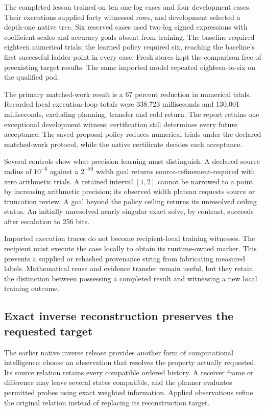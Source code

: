 The completed lesson trained on ten one-log cases and four development cases. Their executions supplied forty witnessed rows, and development selected a depth-one native tree. Six reserved cases used two-log signed expressions with coefficient scales and accuracy goals absent from training. The baseline required eighteen numerical trials; the learned policy required six, reaching the baseline's first successful ladder point in every case. Fresh stores kept the comparison free of preexisting target results. The same imported model repeated eighteen-to-six on the qualified pod.

The primary matched-work result is a 67 percent reduction in numerical trials. Recorded local execution-loop totals were 338.723 milliseconds and 130.001 milliseconds, excluding planning, transfer and cold return. The report retains one exceptional development witness; certification still determines every future acceptance. The saved proposal policy reduces numerical trials under the declared matched-work protocol, while the native certificate decides each acceptance.

Several controls show what precision learning must distinguish. A declared source radius of $10^{-6}$ against a $2^{-80}$ width goal returns source-refinement-required with zero arithmetic trials. A retained interval $[1,2]$ cannot be narrowed to a point by increasing arithmetic precision; its observed width plateau requests source or truncation review. A goal beyond the policy ceiling returns its unresolved ceiling status. An initially unresolved nearly singular exact solve, by contrast, succeeds after escalation to 256 bits.

Imported execution traces do not become recipient-local training witnesses. The recipient must execute the case locally to obtain its runtime-owned marker. This prevents a supplied or rehashed provenance string from fabricating measured labels. Mathematical reuse and evidence transfer remain useful, but they retain the distinction between possessing a completed result and witnessing a new local training outcome.

\subsection{Exact inverse reconstruction preserves the requested target}
\label{v3-runtime-inverse}

The earlier native inverse release provides another form of computational intelligence: choose an observation that resolves the property actually requested. Its source relation retains every compatible ordered history. A receiver frame or difference may leave several states compatible, and the planner evaluates permitted probes using exact weighted information. Applied observations refine the original relation instead of replacing its reconstruction target.

